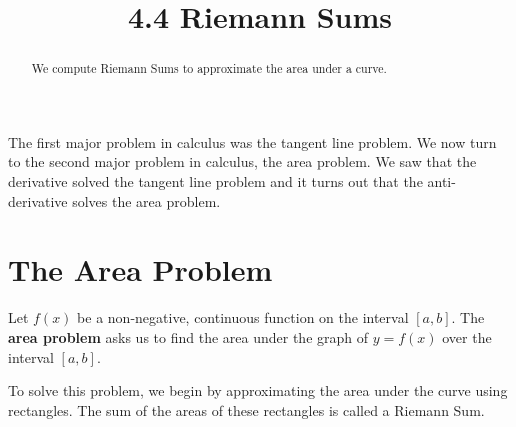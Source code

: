 \documentclass{ximera}
\title{4.4 Riemann Sums}
\begin{document}
\begin{abstract}
We compute Riemann Sums to approximate the area under a curve.
\end{abstract}

\maketitle

The first major problem in calculus was the tangent line problem. We now turn to the second major problem in calculus, the area problem.
We saw that the derivative solved the tangent line problem and it turns out that the anti-derivative solves the area problem.
\section{The Area Problem}


Let $f(x)$ be a non-negative, continuous function on the interval $[a,b]$. The \textbf{area problem} asks us to find the area under the graph of $y = f(x)$
over the interval $[a,b]$.

\begin{image}
\end{image}

To solve this problem, we begin by approximating the area under the curve using rectangles. The sum of the areas of these rectangles is called a Riemann Sum.
\end{document}
